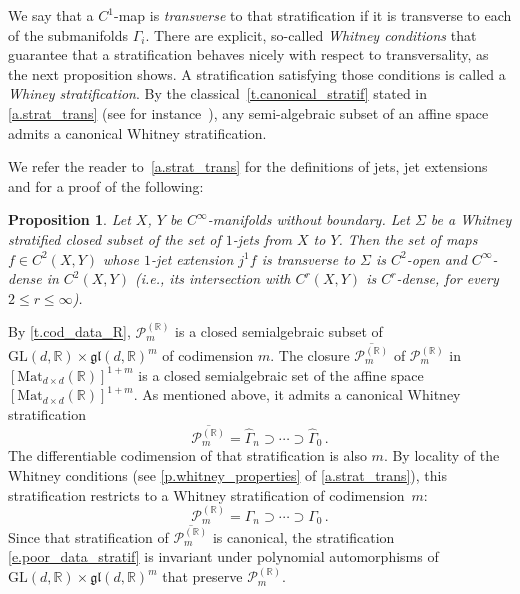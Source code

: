 \documentclass[10pt, a4paper]{amsart}
\theoremstyle{plain}
\newtheorem{prop}[lemma]{Proposition}
\theoremstyle{definition}
\theoremstyle{remark}
\theoremstyle{note}
\numberwithin{equation}{section}
\begin{document}
We say that a $C^1$-map is {\em transverse} to that stratification if it is transverse to each of the submanifolds $\Gamma_i$. 
There are explicit, so-called {\em Whitney conditions} that guarantee that a stratification behaves nicely with respect to transversality, as the next proposition shows. A stratification satisfying those conditions is called a {\em Whiney stratification}.
By the classical~\cref{t.canonical_stratif} stated in \cref{a.strat_trans} (see for instance~\cite{GWPL}), any semi-algebraic subset of an affine space admits a canonical Whitney stratification.

We refer the reader to~\cref{a.strat_trans} for the definitions of jets, jet extensions and for a proof of the following: 
\begin{prop}\label{p.stratifiedtransversality}
Let $X$, $Y$ be $C^\infty$-manifolds without boundary. 
Let ${\Sigma}$ be a Whitney stratified closed subset of the set of $1$-jets from $X$ to $Y$. 
Then the set of maps $f \in C^2(X,Y)$ whose $1$-jet extension $j^1f$ is transverse to ${\Sigma}$ is $C^2$-open and $C^\infty$-dense in $C^2(X,Y)$ (i.e., its intersection with $C^r(X,Y)$ is $C^r$-dense, for every $2\le r\le \infty$).
\end{prop}

By \cref{t.cod_data_R}, ${\mathcal{P}}_m^{({\mathbb{R}})}$ is a closed semialgebraic subset of ${\mathrm{GL}}(d,{\mathbb{R}}) \times {\mathfrak{gl}}(d,{\mathbb{R}})^m$ of codimension $m$.
The closure $\overline{{\mathcal{P}}_m^{({\mathbb{R}})}}$ of ${\mathcal{P}}_m^{({\mathbb{R}})}$ in  $[{\mathrm{Mat}}_{d\times d}({\mathbb{R}})]^{1+m}$ is a closed semialgebraic set of the affine space  $[{\mathrm{Mat}}_{d\times d}({\mathbb{R}})]^{1+m}$. As mentioned above, it admits a canonical Whitney stratification
$$
\overline{{\mathcal{P}}_m^{({\mathbb{R}})}} = \hat \Gamma_n \supset \cdots \supset  \hat \Gamma_0 \, .
$$
The differentiable codimension of that stratification is also $m$. By locality of the Whitney conditions (see \cref{p.whitney_properties} of \cref{a.strat_trans}), this stratification restricts to a Whitney stratification of codimension~$m$:
\begin{equation}\label{e.poor_data_stratif}
{\mathcal{P}}_{m}^{({\mathbb{R}})} = \Gamma_n \supset \cdots \supset \Gamma_0 \, .
\end{equation}
Since that stratification of $\overline{{\mathcal{P}}_m^{({\mathbb{R}})}}$ is canonical, 
the stratification \eqref{e.poor_data_stratif} is invariant under 
polynomial automorphisms of ${\mathrm{GL}}(d,{\mathbb{R}}) \times {\mathfrak{gl}}(d,{\mathbb{R}})^m$ that preserve ${\mathcal{P}}_{m}^{({\mathbb{R}})}$.
\end{document}
